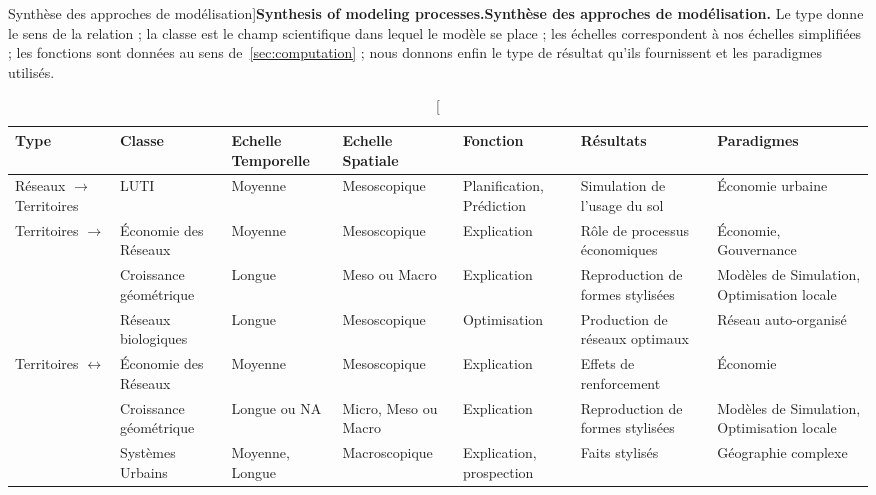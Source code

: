\begin{table}%
\caption[Synthesis of modeling processes][Synthèse des approches de modélisation]{\textbf{Synthesis of modeling processes.}\label{tab:modelingsa:synthesis}}{\textbf{Synthèse des approches de modélisation.} Le type donne le sens de la relation ; la classe est le champ scientifique dans lequel le modèle se place ; les échelles correspondent à nos échelles simplifiées ; les fonctions sont données au sens de~\ref{sec:computation} ; nous donnons enfin le type de résultat qu'ils fournissent et les paradigmes utilisés.\label{tab:modelingsa:synthesis}}
\begin{tabular}{|p{2.5cm}|p{2cm}|p{2.5cm}|p{2.5cm}|p{2.1cm}|p{2.2cm}|p{2cm}|}
\hline
Type & Classe & Echelle Temporelle & Echelle Spatiale & Fonction & Résultats & Paradigmes\\ \hline
Réseaux $\rightarrow$ Territoires & LUTI & Moyenne & Mesoscopique & Planification, Prédiction & Simulation de l'usage du sol & Économie urbaine \\ \hline
\multirow{3}{*}{Territoires $\rightarrow$}& Économie des Réseaux & Moyenne & Mesoscopique & Explication & Rôle de processus économiques & Économie, Gouvernance\\\cline{2-7}
Réseaux& Croissance géométrique & Longue & Meso ou Macro & Explication & Reproduction de formes stylisées & Modèles de Simulation, Optimisation locale \\\cline{2-7}
& Réseaux biologiques & Longue & Mesoscopique & Optimisation & Production de réseaux optimaux & Réseau auto-organisé \\ \hline
\multirow{2}{*}{Territoires $\leftrightarrow$}& Économie des Réseaux & Moyenne & Mesoscopique & Explication & Effets de renforcement & Économie\\\cline{2-7}
Réseaux & Croissance géométrique & Longue ou NA & Micro, Meso ou Macro & Explication & Reproduction de formes stylisées & Modèles de Simulation, Optimisation locale \\\cline{2-7}
& Systèmes Urbains & Moyenne, Longue & Macroscopique & Explication, prospection & Faits stylisés & Géographie complexe\\\hline
\end{tabular}
\end{table}






